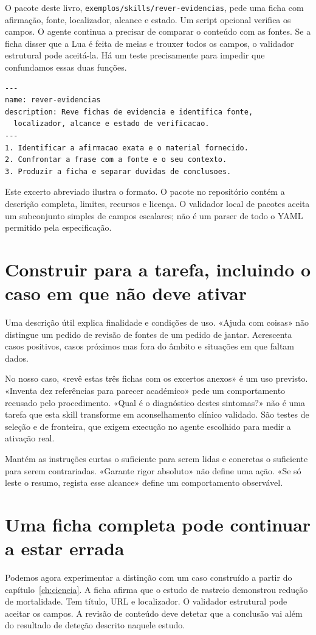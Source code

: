 O pacote deste livro, \texttt{exemplos/skills/rever-evidencias}, pede uma ficha com afirmação, fonte, localizador, alcance e estado. Um script opcional verifica os campos. O agente continua a precisar de comparar o conteúdo com as fontes. Se a ficha disser que a Lua é feita de meias e trouxer todos os campos, o validador estrutural pode aceitá-la. Há um teste precisamente para impedir que confundamos essas duas funções.

\begin{lstlisting}
---
name: rever-evidencias
description: Reve fichas de evidencia e identifica fonte,
  localizador, alcance e estado de verificacao.
---
1. Identificar a afirmacao exata e o material fornecido.
2. Confrontar a frase com a fonte e o seu contexto.
3. Produzir a ficha e separar duvidas de conclusoes.
\end{lstlisting}
Este excerto abreviado ilustra o formato. O pacote no repositório contém a descrição completa, limites, recursos e licença. O validador local de pacotes aceita um subconjunto simples de campos escalares; não é um parser de todo o YAML permitido pela especificação.

\section{Construir para a tarefa, incluindo o caso em que não deve ativar}
Uma descrição útil explica finalidade e condições de uso. «Ajuda com coisas» não distingue um pedido de revisão de fontes de um pedido de jantar. Acrescenta casos positivos, casos próximos mas fora do âmbito e situações em que faltam dados.

No nosso caso, «revê estas três fichas com os excertos anexos» é um uso previsto. «Inventa dez referências para parecer académico» pede um comportamento recusado pelo procedimento. «Qual é o diagnóstico destes sintomas?» não é uma tarefa que esta skill transforme em aconselhamento clínico validado. São testes de seleção e de fronteira, que exigem execução no agente escolhido para medir a ativação real.

Mantém as instruções curtas o suficiente para serem lidas e concretas o suficiente para serem contrariadas. «Garante rigor absoluto» não define uma ação. «Se só leste o resumo, regista esse alcance» define um comportamento observável.

\section{Uma ficha completa pode continuar a estar errada}
Podemos agora experimentar a distinção com um caso construído a partir do capítulo~\ref{ch:ciencia}. A ficha afirma que o estudo de rastreio demonstrou redução de mortalidade. Tem título, URL e localizador. O validador estrutural pode aceitar os campos. A revisão de conteúdo deve detetar que a conclusão vai além do resultado de deteção descrito naquele estudo.

